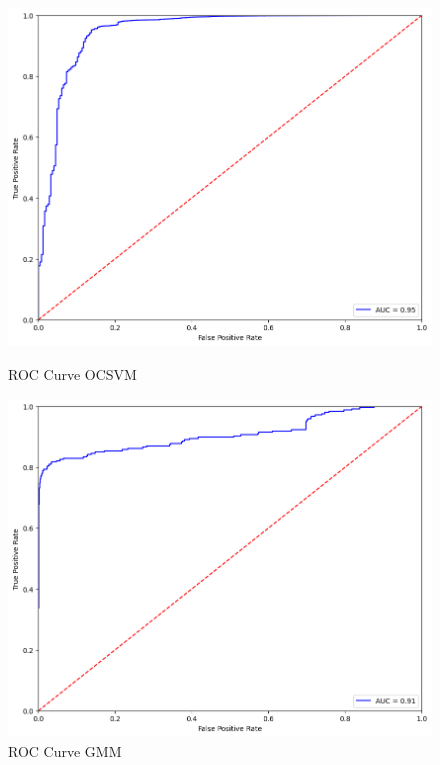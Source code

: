 \begin{figure}[p] %
    \begin{minipage}[t]{0.5\textwidth}
        \vspace{0pt}
        \includegraphics[width=\textwidth]{images/ocsvm-roc.png}
        \caption{ROC Curve OCSVM}
    \end{minipage}
    \hfill
    \begin{minipage}[t]{0.5\textwidth}
        \vspace{0pt}
        \includegraphics[width=\textwidth]{images/gmm-roc.png}
        \caption{ROC Curve GMM}
    \end{minipage}
    

\end{figure}
